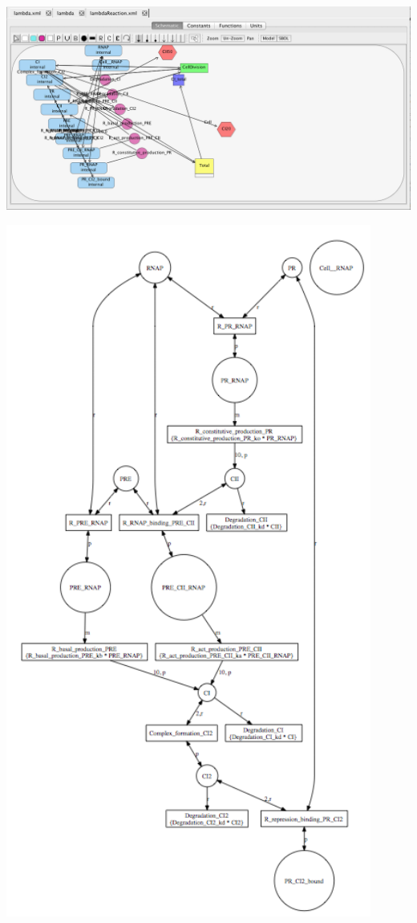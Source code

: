 \documentclass[titlepage,11pt]{article}
\begin{document}
\begin{center}
\includegraphics[width=160mm]{screenshots/reactionModel}
\end{center}

\begin{center}
\includegraphics[width=120mm]{screenshots/viewNetwork}
\end{center}
\end{document}
